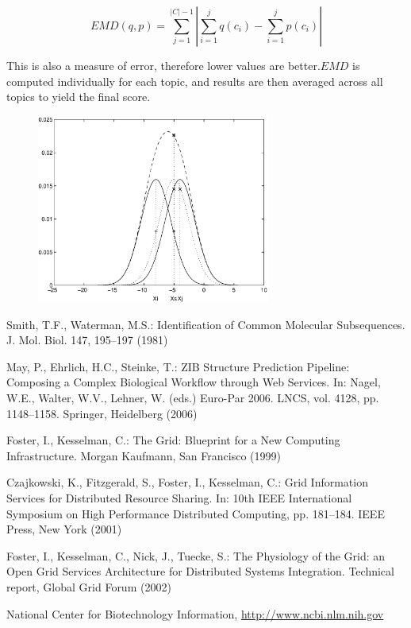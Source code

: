 \documentclass[runningheads,a4paper]{llncs}
\begin{document}
\begin{equation}
EMD(q, p) = \sum_{j=1}^{|C| - 1}|\sum_{i=1}^jq(c_i) - \sum_{i=1}^jp(c_i)|
\end{equation}

This is also a measure of error, therefore lower values are better.$EMD$ is computed individually for each topic, and results are then averaged across all topics to yield the final score.
\begin{figure}
\centering
\includegraphics[height=6.2cm]{eijkel2}
\caption{}
\label{fig:example}
\end{figure}









\begin{thebibliography}{4}

 Smith, T.F., Waterman, M.S.: Identification of Common Molecular
Subsequences. J. Mol. Biol. 147, 195--197 (1981)

 May, P., Ehrlich, H.C., Steinke, T.: ZIB Structure Prediction Pipeline:
Composing a Complex Biological Workflow through Web Services. In: Nagel,
W.E., Walter, W.V., Lehner, W. (eds.) Euro-Par 2006. LNCS, vol. 4128,
pp. 1148--1158. Springer, Heidelberg (2006)

 Foster, I., Kesselman, C.: The Grid: Blueprint for a New Computing
Infrastructure. Morgan Kaufmann, San Francisco (1999)

 Czajkowski, K., Fitzgerald, S., Foster, I., Kesselman, C.: Grid
Information Services for Distributed Resource Sharing. In: 10th IEEE
International Symposium on High Performance Distributed Computing, pp.
181--184. IEEE Press, New York (2001)

 Foster, I., Kesselman, C., Nick, J., Tuecke, S.: The Physiology of the
Grid: an Open Grid Services Architecture for Distributed Systems
Integration. Technical report, Global Grid Forum (2002)

 National Center for Biotechnology Information, \url{http://www.ncbi.nlm.nih.gov}

\end{thebibliography}
\end{document}
